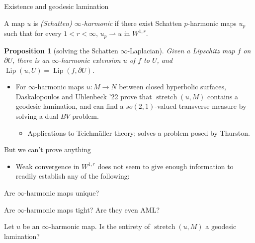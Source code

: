 \documentclass[10pt]{beamer}
\DeclareMathOperator{\Lip}{Lip}
\DeclareMathOperator{\Stretch}{stretch}
\newtheorem{proposition}{Proposition}
\begin{document}
\begin{frame}{Existence and geodesic lamination}
    
\begin{definition}
A map $u$ is \emph{(Schatten) $\infty$-harmonic} if there exist Schatten $p$-harmonic maps $u_p$ such that for every $1 < r < \infty$, $u_p \rightharpoonup u$ in $W^{1, r}$. \pause
\end{definition}

\begin{proposition}[solving the Schatten $\infty$-Laplacian]
    Given a Lipschitz map $f$ on $\partial U$, there is an $\infty$-harmonic extension $u$ of $f$ to $U$, and $\Lip(u, U) = \Lip(f, \partial U)$. \pause
\end{proposition}

\begin{itemize}
    \item For $\infty$-harmonic maps $u: M \to N$ between closed hyperbolic surfaces, Daskalopoulos and Uhlenbeck '22 prove that $\Stretch(u, M)$ contains a geodesic lamination, and can find a $so(2, 1)$-valued transverse measure by solving a dual $BV$ problem.
    \begin{itemize}
        \item Applications to Teichm\"uller theory; solves a problem posed by Thurston.
    \end{itemize}
\end{itemize}
\end{frame}

\begin{frame}{But we can't prove anything}
\begin{itemize}
\item Weak convergence in $W^{1, r}$ does not seem to give enough information to readily establish any of the following: \pause
\end{itemize}

\begin{problem}
Are $\infty$-harmonic maps unique? \pause
\end{problem}

\begin{problem}
Are $\infty$-harmonic maps tight? \pause Are they even AML? \pause
\end{problem}

\begin{problem}
Let $u$ be an $\infty$-harmonic map. Is the entirety of $\Stretch(u, M)$ a geodesic lamination?
\end{problem}
\end{frame}
\end{document}
